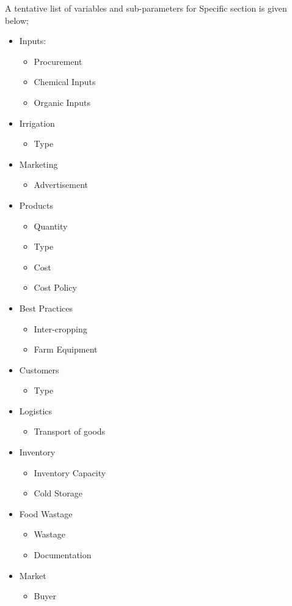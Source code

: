\documentclass[oneside,twocolumn]{article}
\begin{document}
A tentative list of variables and sub-parameters for Specific section
is given below;
\begin{itemize}
  \item Inputs:
    \begin{itemize}
    \item Procurement
    \item Chemical Inputs
    \item Organic Inputs
    \end{itemize}
  \item Irrigation
    \begin{itemize}
      \item Type
    \end{itemize}
  \item Marketing
    \begin{itemize}
      \item Advertisement
    \end{itemize}
  \item Products
    \begin{itemize}
    \item Quantity
    \item Type
    \item Cost
    \item Cost Policy
    \end{itemize}
  \item Best Practices
    \begin{itemize}
    \item Inter-cropping
    \item Farm Equipment
    \end{itemize}
  \item Customers
    \begin{itemize}
    \item Type
    \end{itemize}
  \item Logistics
    \begin{itemize}
    \item Transport of goods
    \end{itemize}
  \item Inventory
    \begin{itemize}
    \item Inventory Capacity
    \item Cold Storage
    \end{itemize}
  \item Food Wastage
    \begin{itemize}
    \item Wastage
    \item Documentation
    \end{itemize}
  \item Market
    \begin{itemize}
    \item Buyer
    \end{itemize}
\end{itemize}
\end{document}
